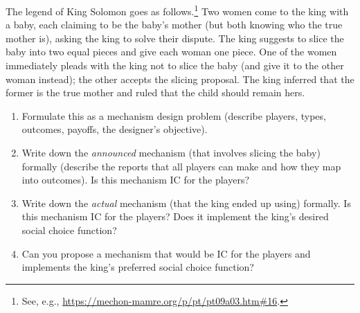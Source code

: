 \documentclass[a4paper]{article}
\newif\ifsolutions
\begin{document}
	The legend of King Solomon goes as follows.\footnote{See, e.g., \url{https://mechon-mamre.org/p/pt/pt09a03.htm#16}.} 
	Two women come to the king with a baby, each claiming to be the baby’s mother (but both knowing who the true mother is), asking the king to solve their dispute. The king suggests to slice the baby into two equal pieces and give each woman one piece. One of the women immediately pleads with the king not to slice the baby (and give it to the other woman instead); the other accepts the slicing proposal. The king inferred that the former is the true mother and ruled that the child should remain hers.
	
	\begin{enumerate}
		\item Formulate this as a mechanism design problem (describe players, types, outcomes, payoffs, the designer's objective).
		
		\item Write down the \emph{announced} mechanism (that involves slicing the baby) formally (describe the reports that all players can make and how they map into outcomes). Is this mechanism IC for the players?
		
		\item Write down the \emph{actual} mechanism (that the king ended up using) formally. Is this mechanism IC for the players? Does it implement the king's desired social choice function?
		
		\item Can you propose a mechanism that would be IC for the players and implements the king's preferred social choice function?
	\end{enumerate}


\ifsolutions
\end{document}
